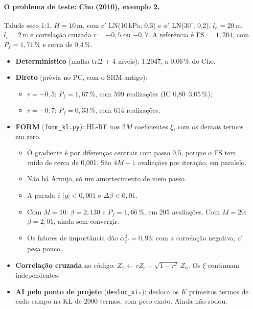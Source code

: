 \paragraph{O problema de teste: Cho (2010), exemplo 2.} Talude seco 1:1, $H = 10$\,m, com $c'$ LN(10\,kPa; 0,3) e $\phi'$
LN($30^\circ$; 0,2), $l_h = 20$\,m, $l_v = 2$\,m e correlação cruzada $r = -0{,}5$ ou $-0{,}7$. A referência é
FS $= 1{,}204$, com $P_f = 1{,}71\,\%$ e cerca de 0,4\,\%.
\begin{itemize}
  \item \textbf{Determinístico} (malha tri2 + 4 níveis): 1,2047, a 0,06\,\% do Cho.
  \item \textbf{Direto} (prévia no PC, com o SRM antigo):
    \begin{itemize}
      \item $r = -0{,}5$: $P_f = 1{,}67\,\%$, com 599 realizações (IC 0,80--3,05\,\%);
      \item $r = -0{,}7$: $P_f = 0{,}33\,\%$, com 614 realizações.
    \end{itemize}
  \item \textbf{FORM} (\texttt{form\_kl.py}): HL-RF nos $2M$ coeficientes $\xi$, com os demais termos em zero.
    \begin{itemize}
      \item O gradiente é por diferenças centrais com passo 0,5, porque o FS tem ruído de cerca de 0,001. São $4M + 1$
        avaliações por iteração, em paralelo.
      \item Não há Armijo, só um amortecimento de meio passo.
      \item A parada é $|g| < 0{,}001$ e $\Delta\beta < 0{,}01$.
      \item Com $M = 10$: $\beta = 2{,}130$ e $P_f = 1{,}66\,\%$, em 205 avaliações. Com $M = 20$: $\beta = 2{,}01$, ainda sem
        convergir.
      \item Os fatores de importância dão $\alpha^2_{\phi'} = 0{,}93$: com a correlação negativa, $c'$ pesa pouco.
    \end{itemize}
  \item \textbf{Correlação cruzada} no código:
    $Z_\phi \leftarrow rZ_c + \sqrt{1 - r^2}\,Z_\phi$. Os $\xi$ continuam independentes.
  \item \textbf{AI pelo ponto de projeto} (\texttt{desloc\_xi=}): desloca os $K$ primeiros termos de cada campo na KL de
    2000 termos, com peso exato. Ainda não rodou.
\end{itemize}


